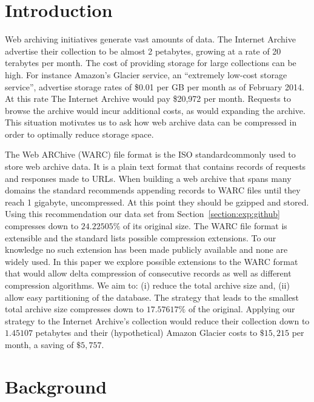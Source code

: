 \documentclass[11pt]{article}
\def \gzipcompressionpct {24.22505}
\def \beststrategypct {17.57617}
\def \newiasize {1.45107}
\def \newglaciercost {15,215}
\def \newglaciersavings {5,757}
\begin{document}
\section{Introduction}

  Web archiving initiatives generate vast amounts of data. The Internet Archive advertise their collection to be almost 2 petabytes, growing at a rate of 20 terabytes per month\footnotemark. The cost of providing storage for large collections can be high. For instance Amazon's Glacier service, an ``extremely low-cost storage service'', advertise storage rates of \$0.01 per GB per month as of February 2014. At this rate The Internet Archive would pay \$20,972 per month. Requests to browse the archive would incur additional costs, as would expanding the archive. This situation motivates us to ask how web archive data can be compressed in order to optimally reduce storage space.

  The Web ARChive (WARC) file format is the ISO standard\footnotemark commonly used to store web archive data. It is a plain text format that contains records of requests and responses made to URLs. When building a web archive that spans many domains the standard recommends appending records to WARC files until they reach 1 gigabyte, uncompressed. At this point they should be gzipped and stored. Using this recommendation our data set from Section~\ref{section:exp:github} compresses down to $\gzipcompressionpct\%$ of its original size. The WARC file format is extensible and the standard lists possible compression extensions. To our knowledge no such extension has been made publicly available and none are widely used. In this paper we explore possible extensions to the WARC format that would allow delta compression of consecutive records as well as different compression algorithms. We aim to: (i) reduce the total archive size and, (ii) allow easy partitioning of the database. The strategy that leads to the smallest total archive size compresses down to $\beststrategypct\%$ of the original. Applying our strategy to the Internet Archive's collection would reduce their collection down to $\newiasize$ petabytes and their (hypothetical) Amazon Glacier costs to $\$\newglaciercost$ per month, a saving of $\$\newglaciersavings$.


\section{Background}
\end{document}
